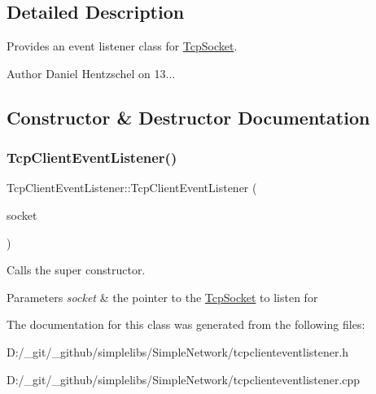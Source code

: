 \subsection{Detailed Description}
Provides an event listener class for \mbox{\hyperlink{class_tcp_socket}{Tcp\+Socket}}. 

\begin{DoxyAuthor}{Author}
Daniel Hentzschel on 13... 
\end{DoxyAuthor}


\subsection{Constructor \& Destructor Documentation}
\mbox{\label{class_tcp_client_event_listener_aec59e53888849d543205bc501743e2ab}} 
\subsubsection{\texorpdfstring{TcpClientEventListener()}{TcpClientEventListener()}}
{\footnotesize\ttfamily Tcp\+Client\+Event\+Listener\+::\+Tcp\+Client\+Event\+Listener (\begin{DoxyParamCaption}\item[{\mbox{\hyperlink{class_tcp_socket}{Tcp\+Socket}} $\ast$}]{socket }\end{DoxyParamCaption})\hspace{0.3cm}{\ttfamily [explicit]}}



Calls the super constructor. 


\begin{DoxyParams}{Parameters}
{\em socket} & the pointer to the \mbox{\hyperlink{class_tcp_socket}{Tcp\+Socket}} to listen for \\
\hline
\end{DoxyParams}


The documentation for this class was generated from the following files\+:\begin{DoxyCompactItemize}
\item 
D\+:/\+\_\+git/\+\_\+github/simplelibs/\+Simple\+Network/tcpclienteventlistener.\+h\item 
D\+:/\+\_\+git/\+\_\+github/simplelibs/\+Simple\+Network/tcpclienteventlistener.\+cpp\end{DoxyCompactItemize}
